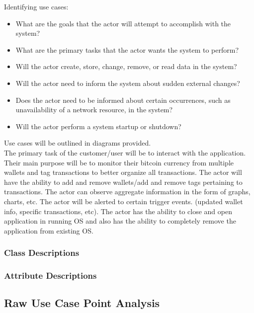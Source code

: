 Identifying use cases:\\
\begin{itemize}
\item What are the goals that the actor will attempt to accomplish with the system?
\item What are the primary tasks that the actor wants the system to perform?
\item Will the actor create, store, change, remove, or read data in the system?
\item Will the actor need to inform the system about sudden external changes?
\item Does the actor need to be informed about certain occurrences, such as unavailability of a network resource, in the system?
\item Will the actor perform a system startup or shutdown?
\end{itemize}

Use cases will be outlined in diagrams provided.\\ 

The primary task of the customer/user will be to interact with the application.  Their main purpose will be to monitor their bitcoin currency from multiple wallets and tag transactions to better organize all transactions.  The actor will have the ability to add and remove wallets/add and remove tags pertaining to transactions. The actor can observe aggregate information in the form of graphs, charts, etc.  The actor will be alerted to certain trigger events. (updated wallet info, specific transactions, etc).  The actor has the ability to close and open application in running OS and also has the ability to completely remove the application from existing OS. \\
	
	
    \subsubsection{Class Descriptions}
      \begin{figure}[H]
      \end{figure}

    \subsubsection{Attribute Descriptions}
  \subsection{Raw Use Case Point Analysis}
